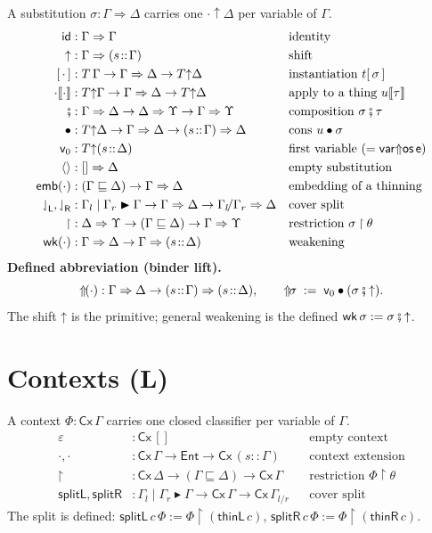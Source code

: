 \documentclass{article}
\newcommand{\thin}{\sqsubseteq}                    %
\newcommand{\os}{\mathsf{os}}
\renewcommand{\oe}{\mathsf{e}}                      %
\newcommand{\Cover}[3]{#1 \mid #2 \blacktriangleright #3}
\newcommand{\thL}{\mathsf{thinL}}
\newcommand{\thR}{\mathsf{thinR}}
\newcommand{\Th}[2]{#1 {\uparrow} #2}              %
\newcommand{\wt}[2]{#1 {\Uparrow} #2}              %
\newcommand{\Sub}[2]{#2 \Rightarrow #1}            %
\newcommand{\selL}{\mathord{{\downharpoonleft}_{\mathsf{L}}}}
\newcommand{\selR}{\mathord{{\downharpoonleft}_{\mathsf{R}}}}
\newcommand{\ids}{\mathsf{id}}
\newcommand{\shift}{\mathord{\uparrow}}             %
\newcommand{\wk}{\mathsf{wk}}
\newcommand{\nil}{\langle\rangle}                   %
\newcommand{\emb}{\mathsf{emb}}
\newcommand{\ins}[1]{[\,#1\,]}                      %
\newcommand{\app}[2]{#1\llbracket#2\rrbracket}      %
\newcommand{\seq}{\mathbin{{\fatsemi}}}             %
\newcommand{\cons}{\mathbin{\bullet}}               %
\newcommand{\vz}{\mathsf{v}_0}                      %
\newcommand{\Up}{\mathord{{\Uparrow}\!}}            %
\newcommand{\Cx}{\mathsf{Cx}}
\newcommand{\rest}{\mathbin{{\restriction}}}        %
\newcommand{\eps}{\varepsilon}
\newcommand{\splitL}{\mathsf{splitL}}
\newcommand{\splitR}{\mathsf{splitR}}
\newcommand{\catL}{\textbf{(L)}}
\theoremstyle{plain}
\begin{document}
A substitution $\sigma : \Sub\Delta\Gamma$ carries one $\Th{\cdot}{\Delta}$ per
variable of $\Gamma$.
\begin{align*}
  \ids        &: \Sub\Gamma\Gamma
    && \text{identity}\\
  \shift      &: \Sub{(s\!::\!\Gamma)}{\Gamma}
    && \text{shift}\\
  \ins\cdot   &: T\,\Gamma \to \Sub\Delta\Gamma \to \Th{T}{\Delta}
    && \text{instantiation } t\ins\sigma\\
  \app{\cdot}{\cdot} &: \Th{T}{\Gamma} \to \Sub\Delta\Gamma \to \Th{T}{\Delta}
    && \text{apply to a thing } \app{u}{\tau}\\
  \seq        &: \Sub\Delta\Gamma \to \Sub\Upsilon\Delta \to \Sub\Upsilon\Gamma
    && \text{composition } \sigma\seq\tau\\
  \cons       &: \Th{T}{\Delta} \to \Sub\Delta\Gamma \to \Sub\Delta{(s\!::\!\Gamma)}
    && \text{cons } u\cons\sigma\\
  \vz         &: \Th{T}{(s\!::\!\Delta)}
    && \text{first variable } (=\wt{\mathsf{var}}{\os\,\oe})\\
  \nil        &: \Sub\Delta{[]}
    && \text{empty substitution}\\
  \emb(\cdot) &: (\Gamma\thin\Delta) \to \Sub\Delta\Gamma
    && \text{embedding of a thinning}\\
  \selL,\selR &: \Cover{\Gamma_l}{\Gamma_r}{\Gamma}\to\Sub\Delta\Gamma\to\Sub\Delta{\Gamma_l\!/\Gamma_r}
    && \text{cover split}\\
  \rest       &: \Sub\Upsilon\Delta \to (\Gamma\thin\Delta) \to \Sub\Upsilon\Gamma
    && \text{restriction } \sigma\rest\theta\\
  \wk(\cdot)  &: \Sub\Delta\Gamma \to \Sub{(s\!::\!\Delta)}{\Gamma}
    && \text{weakening}
\end{align*}
\textbf{Defined abbreviation (binder lift).}
\[
  \Up(\cdot) : \Sub\Delta\Gamma \to \Sub{(s\!::\!\Delta)}{(s\!::\!\Gamma)},
  \qquad
  \Up\sigma \;:=\; \vz \cons (\sigma\seq\shift).
\]
The shift $\shift$ is the primitive; general weakening is the defined
$\wk\,\sigma := \sigma\seq\shift$.

\section{Contexts \hfill \catL}\label{sig:cx}

A context $\Phi : \Cx\,\Gamma$ carries one closed classifier per variable of $\Gamma$.
\begin{align*}
  \eps        &: \Cx\,[]
    && \text{empty context}\\
  \cdot,\cdot &: \Cx\,\Gamma \to \mathsf{Ent} \to \Cx\,(s\!::\!\Gamma)
    && \text{context extension}\\
  \rest       &: \Cx\,\Delta \to (\Gamma\thin\Delta) \to \Cx\,\Gamma
    && \text{restriction } \Phi\rest\theta\\
  \splitL,\splitR &: \Cover{\Gamma_l}{\Gamma_r}{\Gamma}\to\Cx\,\Gamma\to\Cx\,\Gamma_{l\!/\!r}
    && \text{cover split}
\end{align*}
The split is defined: $\splitL\,c\,\Phi := \Phi\rest(\thL\,c)$,
$\splitR\,c\,\Phi := \Phi\rest(\thR\,c)$.
\end{document}
